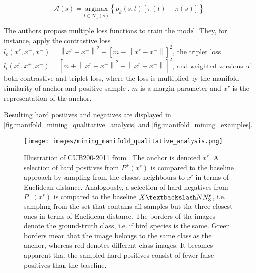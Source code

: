 \begin{equation}
    \mathcal{A}(s) = \underset{t \in \mathcal{N_\varepsilon}(s)}{\text{argmax}} \left\{ p_k(s,t)\left[ \pi(t)-\pi(s) \right] \right\}
    \label{eq:authority_ascent_shift}
\end{equation}



The authors propose multiple loss functions to train the model.
They, for instance, apply the contrastive loss $l_c(x^r, x^+, x^-)= \left\| x^r - x^+ \right\|^2 + \left[ m - \left\| x^r - x^- \right\| \right]^2$, 
the triplet loss $l_t(x^r, x^+, x^-)= \left[ m +  \left\| x^r - x^+ \right\| ^2 - \left\| x^r - x^- \right\| \right]^2$, 
and weighted versions of both contrastive and triplet loss, where the loss is multiplied by the manifold similarity of anchor and positive sample \citet{mining_manifolds_2018}.
$m$ is a margin parameter and $x^r$ is the representation of the anchor.

Resulting hard positives and negatives are displayed in \autoref{fig:manifold_mining_qualitative_analysis} and \autoref{fig:manifold_mining_examples}.

\begin{figure}[!htb] %
    \centering
    \texttt{[image: images/mining\_manifold\_qualitative\_analysis.png]}
    \caption{Illustration of CUB200-2011 from \citet{mining_manifolds_2018}.
    The anchor is denoted $x^r$.
    A selection of hard positives from $P^+(x^r)$ is compared to the 
    baseline approach by sampling from the closest neighbours to $x^r$ in 
    terms of Euclidean distance.
    Analogously, a selection of hard negatives from $P^-(x^r)$ 
    is compared to the baseline $X \textbackslash NN^e_3$, 
    i.e. sampling from the set that contains all samples but the three closest ones in 
    terms of Euclidean distance.
    The borders of the images denote the ground-truth class, i.e. if bird species is the same.
    Green borders mean that the image belongs to the same class as the anchor,
    whereas red denotes different class images.
    It becomes apparent that the sampled hard positives consist of fewer false positives 
    than the baseline.
    }
    \label{fig:manifold_mining_qualitative_analysis}
\end{figure}

